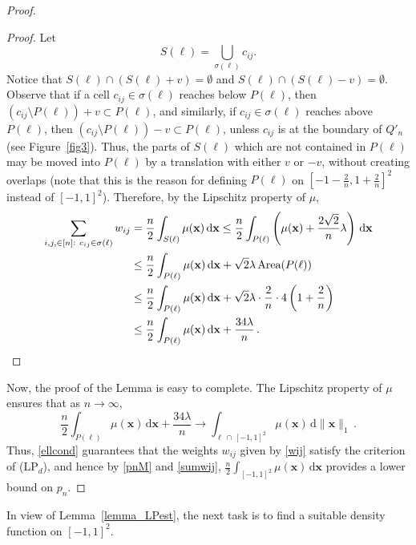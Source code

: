 \documentclass[11pt,a4paper]{amsart}
\newcommand{\dd}{\,\mathrm{d}}
\newcommand{\x}{\mathbf{x}}
\begin{document}
\begin{proof}
\begin{proof}
Let
\[
S(\ell) = \bigcup_{\sigma(\ell)} c_{ij}.
\]
Notice that $S(\ell) \cap( S(\ell) + v )= \emptyset$ and $S(\ell) \cap( S(\ell) - v )= \emptyset$. Observe that if a cell $c_{ij} \in \sigma(\ell)$ reaches below $P(\ell)$, then $( c_{ij} \setminus P(\ell) ) + v \subset P(\ell)$, and similarly, if $c_{ij} \in \sigma(\ell)$ reaches above $P(\ell)$, then $( c_{ij} \setminus P(\ell) ) - v \subset P(\ell)$, unless $c_{ij}$ is at the boundary of $Q'_n$ (see Figure~\ref{fig3}). Thus, the parts of $S(\ell)$ which are not contained in $P(\ell)$ may be moved into $P(\ell)$ by a translation with either $v$ or $-v$, without creating overlaps (note that this is the reason for defining $P(\ell)$ on $[-1 - \frac 2 n,1+ \frac 2 n]^2$  instead of $[-1, 1]^2$). Therefore, by the Lipschitz property of $\mu$,
\begin{align*}
 \sum_{i,j, \in [n]: \ c_{ij} \in \sigma(\ell)} w_{ij} &= \frac n 2 \int_{S(\ell)} \mu(\x) \dd \x
 \leq \frac n 2 \int_{P(\ell)} \left(\mu(\x) +  \frac{2 \sqrt{2}}{n}\lambda \right) \dd \x \\
 &\leq \frac n 2 \int_{P(\ell)} \mu(\x)  \dd \x +\sqrt{2} \lambda \, \textrm{Area}(P(\ell)) \\
 & \leq \frac n 2 \int_{P(\ell)} \mu(\x)  \dd \x + \sqrt{2} \lambda \cdot \frac 2 n \cdot 4 \left(1 + \frac 2 n  \right)\\
 & \leq \frac n 2 \int_{P(\ell)} \mu(\x)  \dd \x  + \frac {34 \lambda}{n}\,.
 \qedhere
\end{align*}
\end{proof}

Now, the proof of the Lemma is easy to complete.
The Lipschitz property of $\mu$ ensures that as $n \rightarrow \infty$,
\[
 \frac n 2 \int_{P(\ell)} \mu(\x)  \dd \x  + \frac {34 \lambda}{n}\rightarrow \int_{\ell \,\cap\, [-1,1]^2} \mu(\x) \dd \|\x\|_1 \,.
\]
Thus, \eqref{ellcond} guarantees that the weights $w_{ij}$ given by \eqref{wij} satisfy the criterion of (LP$_d$), and hence by \eqref{pnM} and \eqref{sumwij}, $\frac n 2 \int_{[-1,1]^2} \mu(\x) \dd \x$ provides a lower bound on $p_n$.
\end{proof}

In view of Lemma~\ref{lemma_LPest}, the next  task is to find a suitable density function on $[-1,1]^2$.
\end{document}
